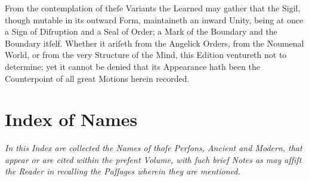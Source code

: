 \documentclass[12pt]{article}
\begin{document}
\vspace{1em}

From the contemplation of theſe Variants the Learned may gather that the 
Sigil, though mutable in its outward Form, maintaineth an inward Unity, 
being at once a Sign of Diſruption and a Seal of Order; a Mark of the Boundary 
and the Boundary itſelf. Whether it ariſeth from the Angelick Orders, from 
the Noumenal World, or from the very Structure of the Mind, this Edition 
ventureth not to determine; yet it cannot be denied that its Appearance 
hath been the Counterpoint of all great Motions herein recorded.

\newpage

\section*{Index of Names}

\begin{center}
\textit{In this Index are collected the Names of thoſe Perſons, Ancient and Modern, 
that appear or are cited within the preſent Volume, with ſuch brief Notes as may 
aſſiſt the Reader in recalling the Paſſages wherein they are mentioned.}
\end{center}

\vspace{1em}
\end{document}
